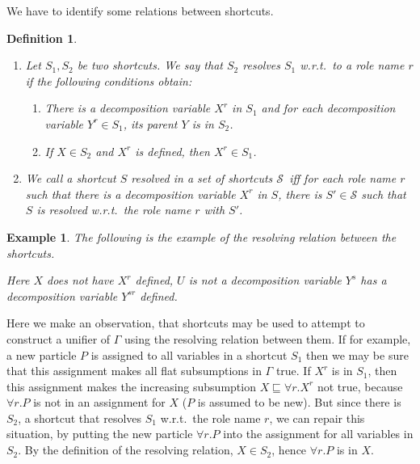 \documentclass{article}
\newtheorem{example}{Example}
\newtheorem{definition}{Definition}
\newcommand{\wrt}{w.r.t.\ }
\renewcommand{\S}{\ensuremath{\mathcal{S}}}
\begin{document}
We have to identify some relations between shortcuts.

\begin{definition}\label{definition:resolving}
	\begin{enumerate}
\item 	Let $S_1, S_2$ be two shortcuts. We say that $S_2$ resolves $S_1$ \wrt to a role name $r$ if the following conditions obtain:
	\begin{enumerate}
		\item\label{condition:increasing} There is a decomposition variable $X^r$ in $S_1$ and for each decomposition variable $Y^r \in S_1$, its parent $Y$ is in $S_2$.
		\item\label{condition:decreasing} If $X \in S_2$ and $X^r$ is defined, then $X^r \in S_1$.
	\end{enumerate}
	\item We call a shortcut $S$ \emph{resolved} in a set of shortcuts \S\ iff for each role name $r$ such that there is a decomposition variable 
	$X^r$ in $S$, there is $S' \in \S$ such that $S$ is resolved \wrt the role name $r$ with $S'$.
	\end{enumerate}
\end{definition}
\begin{example}
The following is the example of the resolving relation between the shortcuts.\\
	Here $X$ does not have $X^r$ defined, $U$ is not a decomposition variable $Y^s$ has a decomposition variable $Y^{sr}$ defined.
\end{example}

Here we make an observation, that shortcuts may be used to attempt to construct a unifier of $\Gamma$ using the resolving relation between them.
If for example, a new particle $P$ is assigned to all variables in a shortcut $S_1$ then we may be sure that this assignment makes all flat subsumptions in $\Gamma$ true. If $X^r$ is in $S_1$, then this assignment makes the increasing subsumption $X \sqsubseteq \forall r.X^r$ not true, because
$\forall r.P$ is not in an assignment for $X$ ($P$ is assumed to be new).
But since there is $S_2$, a shortcut that resolves $S_1$ \wrt the role name $r$, we can repair this situation, by putting 
the new particle $\forall r.P$ into the assignment for all variables in $S_2$. 
By the definition of the resolving relation, $X \in S_2$, hence $\forall r.P$ is in $X$.
\end{document}
